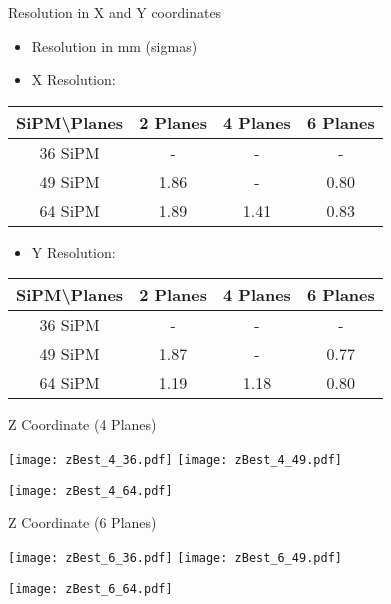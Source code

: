 \documentclass{beamer}
\begin{document}
\begin{frame}{Resolution in X and Y coordinates}
\begin{center}
\begin{itemize}
\item Resolution in mm (sigmas)
\item X Resolution:
\vspace{0.5 cm}
\end{itemize}
 \begin{tabular}{c|ccc|}
  \toprule
  SiPM\textbackslash Planes & \textbf{2 Planes} & \textbf{4 Planes} & \textbf{6 Planes} \\
   \hline
  36 SiPM & - & - & -  \\
  49 SiPM & 1.86 & - & 0.80\\
  64 SiPM & 1.89 & 1.41 & 0.83 \\    \toprule
 \end{tabular}
\begin{itemize}
\item Y Resolution:
\vspace{0.5 cm}
\end{itemize}
 \begin{tabular}{c|ccc|}
  \toprule
  SiPM\textbackslash Planes & \textbf{2 Planes} & \textbf{4 Planes} & \textbf{6 Planes} \\
   \hline
  36 SiPM & - & - & -  \\
  49 SiPM & 1.87 & - & 0.77\\
  64 SiPM & 1.19 & 1.18 & 0.80 \\    \toprule
 \end{tabular}
\end{center}
\end{frame}

\begin{frame}{Z Coordinate (4 Planes)}
\begin{adjustwidth}{-1.5em}{-1.5em}
	\texttt{[image: zBest\_4\_36.pdf]}
	\texttt{[image: zBest\_4\_49.pdf]} \\
	\begin{center} {\texttt{[image: zBest\_4\_64.pdf]}} \end{center}
\end{adjustwidth}
\end{frame}

\begin{frame}{Z Coordinate (6 Planes)}
\begin{adjustwidth}{-1.5em}{-1.5em}
	\texttt{[image: zBest\_6\_36.pdf]}
	\texttt{[image: zBest\_6\_49.pdf]} \\
	\begin{center} {\texttt{[image: zBest\_6\_64.pdf]}} \end{center}
\end{adjustwidth}
\end{frame}
\end{document}

